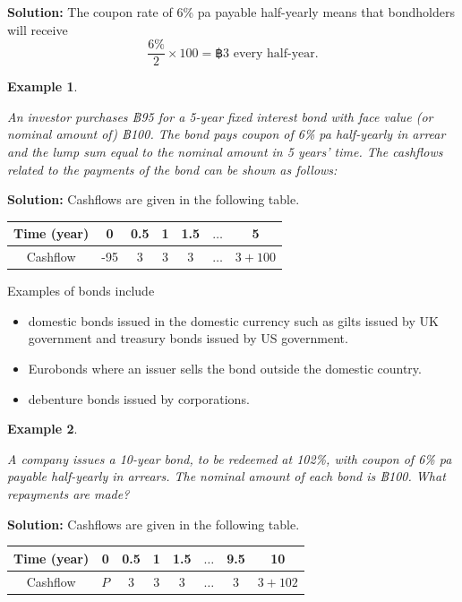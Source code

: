 \documentclass[landscape, 20pt]{extreport}
\theoremstyle{definition}
\theoremstyle{definition}
\newtheorem{example}{Example}[chapter]
\theoremstyle{definition}
\theoremstyle{definition}
\theoremstyle{remark}
\begin{document}
\textbf{Solution:} The coupon rate of 6\% pa payable half-yearly means that bondholders will receive
\[ \frac{6\%}{2} \times 100 = ฿ 3 \text{ every half-year}.\]

\newpage \begin{example}
\protect\hypertarget{exm:unlabeled-div-47}{}\label{exm:unlabeled-div-47}

\emph{An investor purchases ฿95 for a 5-year fixed interest
bond with face value (or nominal amount of) ฿100. The bond pays coupon
of 6\% pa half-yearly in arrear and the lump sum equal to the nominal
amount in 5 years' time. The cashflows related to the payments of the
bond can be shown as follows:}

\end{example}

\textbf{Solution:} Cashflows are given in the following table.

\begin{longtable}[]{@{}ccccccc@{}}
\toprule
Time (year) & 0 & 0.5 & 1 & 1.5 & \(\ldots\) & 5 \\
\midrule
\endhead
Cashflow & -95 & 3 & 3 & 3 & \(\ldots\) & \(3 + 100\) \\
\bottomrule
\end{longtable}

Examples of bonds include

\begin{itemize}
\item
  domestic bonds issued in the domestic currency such as gilts issued
  by UK government and treasury bonds issued by US government.
\item
  Eurobonds where an issuer sells the bond outside the domestic
  country.
\item
  debenture bonds issued by corporations.
\end{itemize}

\newpage \begin{example}
\protect\hypertarget{exm:exampleBondPrice}{}\label{exm:exampleBondPrice}

\emph{A company issues a 10-year bond, to be redeemed at
102\%, with coupon of 6\% pa payable half-yearly in arrears. The nominal
amount of each bond is ฿100. What repayments are made?}

\end{example}

\textbf{Solution:} Cashflows are given in the following table.

\begin{longtable}[]{@{}cccccccc@{}}
\toprule
Time (year) & 0 & 0.5 & 1 & 1.5 & \(\ldots\) & 9.5 & 10 \\
\midrule
\endhead
Cashflow & \(P\) & 3 & 3 & 3 & \(\ldots\) & \(3\) & \(3 + 102\) \\
\bottomrule
\end{longtable}
\end{document}
